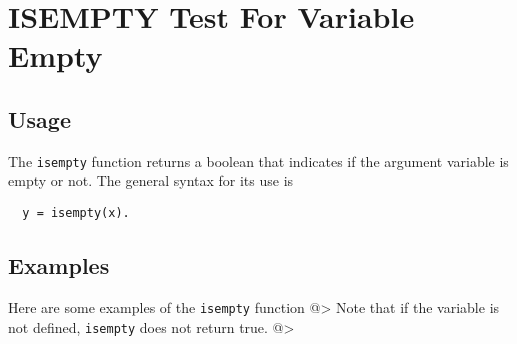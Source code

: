 \section{ISEMPTY Test For Variable Empty}

\subsection{Usage}

The \verb|isempty| function returns a boolean that indicates
if the argument variable is empty or not.  The general
syntax for its use is
\begin{verbatim}
  y = isempty(x).
\end{verbatim}
\subsection{Examples}

Here are some examples of the \verb|isempty| function
@>
Note that if the variable is not defined, \verb|isempty| 
does not return true.
@>
